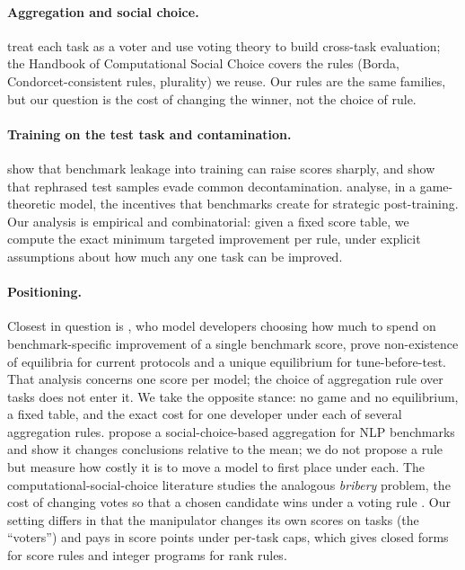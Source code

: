 \documentclass{article}
\begin{document}
\paragraph{Aggregation and social choice.}
\citet{lanctot2025vase} treat each task as a voter and use voting theory to build cross-task evaluation; the Handbook of Computational Social Choice \citep{brandt2016handbook} covers the rules (Borda, Condorcet-consistent rules, plurality) we reuse. Our rules are the same families, but our question is the cost of changing the winner, not the choice of rule.

\paragraph{Training on the test task and contamination.}
\citet{zhou2023cheater} show that benchmark leakage into training can raise scores sharply, and \citet{yang2023rephrased} show that rephrased test samples evade common decontamination. \citet{chen2026incentives} analyse, in a game-theoretic model, the incentives that benchmarks create for strategic post-training. Our analysis is empirical and combinatorial: given a fixed score table, we compute the exact minimum targeted improvement per rule, under explicit assumptions about how much any one task can be improved.

\paragraph{Positioning.}
Closest in question is \citet{chen2026incentives}, who model developers choosing how much to spend on benchmark-specific improvement of a single benchmark score, prove non-existence of equilibria for current protocols and a unique equilibrium for tune-before-test. That analysis concerns one score per model; the choice of aggregation rule over tasks does not enter it. We take the opposite stance: no game and no equilibrium, a fixed table, and the exact cost for one developer under each of several aggregation rules. \citet{colombo2022best} propose a social-choice-based aggregation for NLP benchmarks and show it changes conclusions relative to the mean; we do not propose a rule but measure how costly it is to move a model to first place under each. The computational-social-choice literature studies the analogous \emph{bribery} problem, the cost of changing votes so that a chosen candidate wins under a voting rule \citep{faliszewski2009bribery,brandt2016handbook}. Our setting differs in that the manipulator changes its own scores on tasks (the ``voters'') and pays in score points under per-task caps, which gives closed forms for score rules and integer programs for rank rules.
\end{document}
